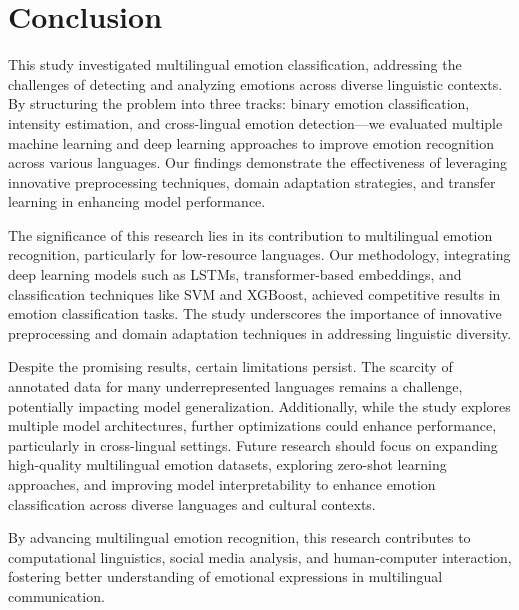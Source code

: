 \section{Conclusion}
This study investigated multilingual emotion classification, addressing the challenges of detecting and analyzing emotions across diverse linguistic contexts. By structuring the problem into three tracks: binary emotion classification, intensity estimation, and cross-lingual emotion detection—we evaluated multiple machine learning and deep learning approaches to improve emotion recognition across various languages. Our findings demonstrate the effectiveness of leveraging innovative preprocessing techniques, domain adaptation strategies, and transfer learning in enhancing model performance.

The significance of this research lies in its contribution to multilingual emotion recognition, particularly for low-resource languages. Our methodology, integrating deep learning models such as LSTMs, transformer-based embeddings, and classification techniques like SVM and XGBoost, achieved competitive results in emotion classification tasks. The study underscores the importance of innovative preprocessing and domain adaptation techniques in addressing linguistic diversity.

Despite the promising results, certain limitations persist. The scarcity of annotated data for many underrepresented languages remains a challenge, potentially impacting model generalization. Additionally, while the study explores multiple model architectures, further optimizations could enhance performance, particularly in cross-lingual settings. Future research should focus on expanding high-quality multilingual emotion datasets, exploring zero-shot learning approaches, and improving model interpretability to enhance emotion classification across diverse languages and cultural contexts.

By advancing multilingual emotion recognition, this research contributes to computational linguistics, social media analysis, and human-computer interaction, fostering better understanding of emotional expressions in multilingual communication.

